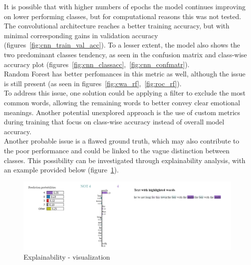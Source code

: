 It is possible that with higher numbers of epochs the model continues improving
on lower performing classes, but for computational reasons this was not tested.\\

The convolutional architecture reaches a better training accuracy, but with minimal
corresponding gains in validation accuracy
(figures~\ref{fig:cnn_train_val_acc}).
To a lesser extent, the model also shows the two predominant classes tendency,
as seen in the confusion matrix and class-wise accuracy plot
(figures~\ref{fig:cnn_classacc},~\ref{fig:cnn_confmatr}).\\

Random Forest has better perfomances in this metric as well,
although the issue is still present (as seen in
figures~\ref{fig:cwa_rf},~\ref{fig:roc_rf}).\\

To address this issue, one solution could be applying a filter to exclude the most
common words, allowing the remaining words to better convey clear emotional
meanings. Another potential unexplored approach is the use of custom
metrics during training that focus on class-wise accuracy instead of overall model
accuracy.\\

Another probable issue is a flawed ground truth, which may
also contribute to the poor performance and could be linked to the vague distinction
between classes.
This possibility can be investigated through explainability analysis, with an
example provided below (figure~\ref{fig:expl}).

\begin{figure}[H]
    \centering
    \includegraphics[scale= 0.55]{pictures/expl.png}
    \caption{Explainability - visualization}
    \label{fig:expl}
\end{figure}

